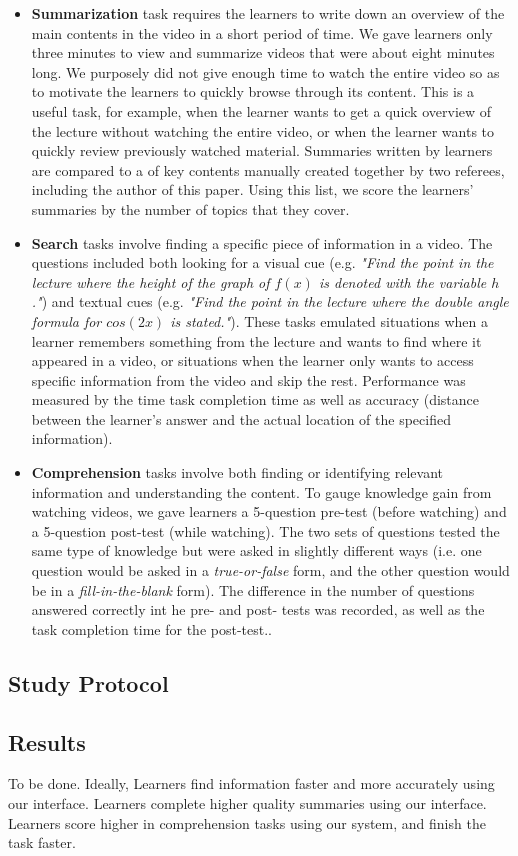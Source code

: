 \begin{itemize}
\item \textbf{Summarization} task requires the learners to write down an overview of the main contents in the video in a short period of time. We gave learners only three minutes to view and summarize videos that were about eight minutes long. We purposely did not give enough time to watch the entire video so as to motivate the learners to quickly browse through its content. This is a useful task, for example, when the learner wants to get a quick overview of the lecture without watching the entire video, or when the learner wants to quickly review previously watched material. 
Summaries written by learners are compared to a  of key contents manually created together by two referees, including the author of this paper. Using this list, we score the learners' summaries by the number of topics that they cover.
\item \textbf{Search} tasks involve finding a specific piece of information in a video. The questions included both looking for a visual cue (e.g. \textit{"Find the point in the lecture where the height of the graph of $f(x)$ is denoted with the variable $h$."}) and textual cues (e.g. \textit{"Find the point in the lecture where the double angle formula for $cos(2x)$ is stated."}). These tasks emulated situations when a learner remembers something from the lecture and wants to find where it appeared in a video, or situations when the learner only wants to access specific information from the video and skip the rest. Performance was measured by the time task completion time as well as accuracy (distance between the learner's answer and the actual location of the specified information).
\item \textbf{Comprehension} tasks involve both finding or identifying relevant information and understanding the content. To gauge knowledge gain from watching videos, we gave learners a 5-question pre-test (before watching) and a 5-question post-test (while watching). The two sets of questions tested the same type of knowledge but were asked in slightly different ways (i.e. one question
would be asked in a \textit{true-or-false} form, and the other question would be in a \textit{fill-in-the-blank} form). The difference in the number of questions answered correctly int he pre- and post- tests was recorded, as well as the task completion time for the post-test.. 
\end{itemize}

\subsection{Study Protocol}
\subsection{Results}
To be done. Ideally, Learners find information faster and more accurately using our interface. Learners complete higher quality summaries using our interface. Learners score higher in comprehension tasks using our system, and finish the task faster.
